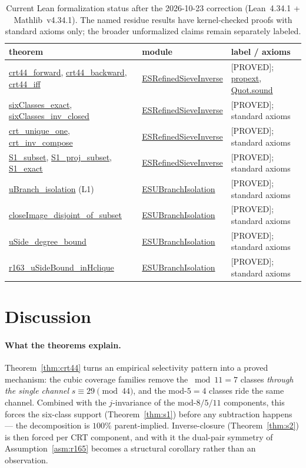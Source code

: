 \documentclass[11pt,a4paper]{article}
\theoremstyle{definition}
\begin{document}
\begin{table}[t]
  \centering
  \caption{Current Lean formalization status after the 2026-10-23
    correction (Lean~4.34.1 + Mathlib~v4.34.1). The named residue
    results have kernel-checked proofs with standard axioms only;
    the broader unformalized claims remain separately labeled.}
  \label{tab:lean}
  \begin{tabular}{lll}
    \toprule
    theorem & module & label / axioms \\
    \midrule
    \url{crt44_forward}, \url{crt44_backward}, \url{crt44_iff}
      & \url{ESRefinedSieveInverse} & [PROVED]; \url{propext}, \url{Quot.sound} \\
    \url{sixClasses_exact}, \url{sixClasses_inv_closed}
      & \url{ESRefinedSieveInverse} & [PROVED]; standard axioms \\
    \url{crt_unique_one}, \url{crt_inv_compose}
      & \url{ESRefinedSieveInverse} & [PROVED]; standard axioms \\
    \url{S1_subset}, \url{S1_proj_subset}, \url{S1_exact}
      & \url{ESRefinedSieveInverse} & [PROVED]; standard axioms \\
    \url{uBranch_isolation} (L1)
      & \url{ESUBranchIsolation} & [PROVED]; standard axioms \\
    \url{closeImage_disjoint_of_subset}
      & \url{ESUBranchIsolation} & [PROVED]; standard axioms \\
    \url{uSide_degree_bound}
      & \url{ESUBranchIsolation} & [PROVED]; standard axioms \\
    \url{r163_uSideBound_inHclique}
      & \url{ESUBranchIsolation} & [PROVED]; standard axioms \\
    \bottomrule
  \end{tabular}
\end{table}

\section{Discussion}
\label{sec:discussion}

\paragraph{What the theorems explain.} Theorem~\ref{thm:crt44} turns an
empirical selectivity pattern into a proved mechanism: the cubic
coverage families remove the $\bmod11=7$ classes \emph{through the
single channel} $s\equiv29\pmod{44}$, and the mod-$5=4$ classes ride
the same channel. Combined with the $j$-invariance of the mod-$8/5/11$
components, this forces the six-class support (Theorem~\ref{thm:s1})
before any subtraction happens --- the decomposition is $100\%$
parent-implied. Inverse-closure (Theorem~\ref{thm:s2}) is then forced
per CRT component, and with it the dual-pair symmetry of
Assumption~\ref{asm:r165} becomes a structural corollary rather than
an observation.
\end{document}
